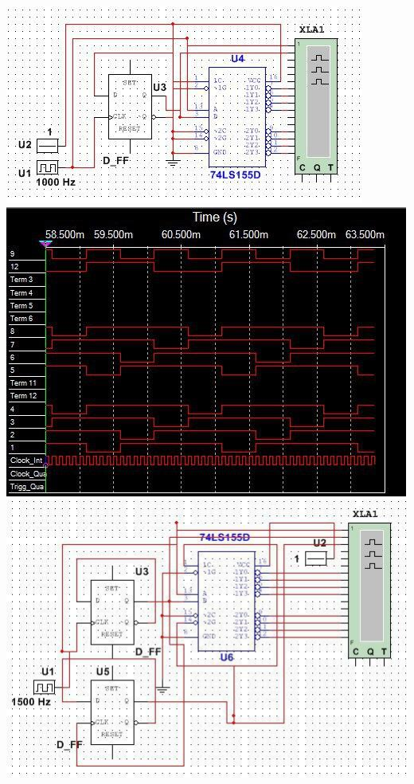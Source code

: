 \documentclass[a4paper,12pt]{article}
\begin{document}
\begin{center}
	\includegraphics[scale=1.3]{../screens/2_1.jpg} \newline\newline\newline\newline
	\includegraphics[scale=1.3]{../screens/2_2.jpg} \newline\newline
	\includegraphics[scale=0.9]{../screens/3_1.jpg} \newline\newline

\end{center}
\end{document}
